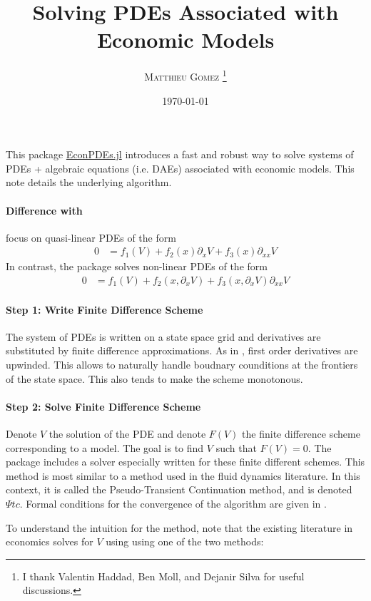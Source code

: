 \documentclass[english]{article}
\begin{document}
	\title{Solving PDEs Associated with Economic Models}
	\author{\large{\textsc{Matthieu Gomez \thanks{I thank Valentin Haddad, Ben Moll, and Dejanir Silva for useful discussions.}}}}
	\date{\today}
	\maketitle
	This package \href{https://github.com/matthieugomez/EconPDEs.jl}{EconPDEs.jl} introduces a fast and robust way to solve systems of PDEs + algebraic equations (i.e. DAEs) associated with economic models. This note details the underlying algorithm. 
	\paragraph{Difference with \citet{achdou2014heterogeneous}}
	 \citet{achdou2014heterogeneous} focus on quasi-linear PDEs of the form
	\begin{align*}
		0&=f_1(V)  + f_2(x) \partial_x V  + f_3(x) \partial_{xx} V
	\end{align*}
	In contrast, the package solves non-linear PDEs of the form
		\begin{align*}
			0&=f_1(V)  + f_2(x, \partial_x V)  + f_3(x, \partial_x V) \partial_{xx} V
		\end{align*}

	

	\paragraph{Step 1: Write Finite Difference Scheme}
	The system of PDEs is written on a state space grid and derivatives are substituted by finite difference approximations. As in \citet{achdou2014heterogeneous},  first order derivatives are upwinded. This allows to naturally handle boudnary counditions at the frontiers of the state space. This also tends to make the scheme monotonous.

	\paragraph{Step 2: Solve Finite Difference Scheme}

	Denote $V$  the solution of the PDE and denote $F(V)$ the finite difference scheme corresponding to a model. The goal is to find $V$ such that $F(V) = 0$. The package includes a solver especially written for these finite different schemes. This method is most similar to a method used in the fluid dynamics literature. In this context, it is called the Pseudo-Transient Continuation method, and is denoted $\Psi tc$. Formal conditions for the convergence of the algorithm are given in  \citet{kelley1998convergence}.\par
	To understand the intuition for the method, note that the existing literature in economics solves for $V$ using using one of the two methods:
\end{document}
